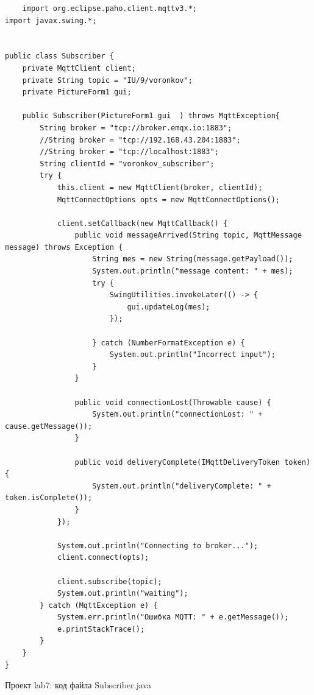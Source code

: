 \documentclass[a4paper, 14pt]{extarticle}
\begin{document}
\begin{lstlisting}
    import org.eclipse.paho.client.mqttv3.*;
import javax.swing.*;


public class Subscriber {
    private MqttClient client;
    private String topic = "IU/9/voronkov";
    private PictureForm1 gui;

    public Subscriber(PictureForm1 gui  ) throws MqttException{
        String broker = "tcp://broker.emqx.io:1883";
        //String broker = "tcp://192.168.43.204:1883";
        //String broker = "tcp://localhost:1883";
        String clientId = "voronkov_subscriber";
        try {
            this.client = new MqttClient(broker, clientId);
            MqttConnectOptions opts = new MqttConnectOptions();

            client.setCallback(new MqttCallback() {
                public void messageArrived(String topic, MqttMessage message) throws Exception {
                    String mes = new String(message.getPayload());
                    System.out.println("message content: " + mes);
                    try {
                        SwingUtilities.invokeLater(() -> {
                            gui.updateLog(mes);
                        });

                    } catch (NumberFormatException e) {
                        System.out.println("Incorrect input");
                    }
                }

                public void connectionLost(Throwable cause) {
                    System.out.println("connectionLost: " + cause.getMessage());
                }

                public void deliveryComplete(IMqttDeliveryToken token) {
                    System.out.println("deliveryComplete: " + token.isComplete());
                }
            });

            System.out.println("Connecting to broker...");
            client.connect(opts);

            client.subscribe(topic);
            System.out.println("waiting");
        } catch (MqttException e) {
            System.err.println("Ошибка MQTT: " + e.getMessage());
            e.printStackTrace();
        }
    }
}
\end{lstlisting}
\par
Проект lab7: код файла Subscriber.java
\end{document}
